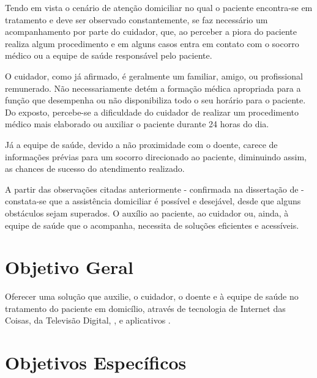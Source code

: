 Tendo em vista o cenário de atenção domiciliar no qual o paciente
encontra-se em tratamento e deve ser observado constantemente, 
se faz necessário um acompanhamento por parte do cuidador, que, ao perceber 
a piora do paciente realiza algum procedimento e em alguns casos entra 
em contato com o socorro médico ou a equipe de saúde responsável pelo paciente.

O cuidador, como já afirmado, é geralmente um familiar, amigo, ou profissional
remunerado. Não necessariamente detém a formação médica apropriada para a função que 
desempenha ou não disponibiliza todo o seu horário para o paciente. Do exposto,
percebe-se a dificuldade do cuidador de realizar um procedimento médico mais
elaborado ou auxiliar o paciente durante 24 horas do dia.

Já a equipe de saúde, devido a não proximidade com o doente, carece de informações
prévias para um socorro direcionado ao paciente, diminuindo assim, as chances de
sucesso do atendimento realizado.


A partir das observações citadas anteriormente - confirmada na dissertação
de  - constata-se que a assistência
domiciliar é possível e desejável, desde que alguns obstáculos sejam superados.
O auxílio ao paciente, ao cuidador ou, ainda, à equipe de saúde que o
acompanha, necessita de soluções eficientes e acessíveis.

\section{Objetivo Geral}\label{sec:objetivos}

Oferecer uma solução que auxilie, o cuidador, o doente e à equipe de saúde no tratamento 
do paciente em domicílio, através de tecnologia de Internet das Coisas, da Televisão Digital,
\smartphones, e aplicativos \web.

\section{Objetivos Específicos}

